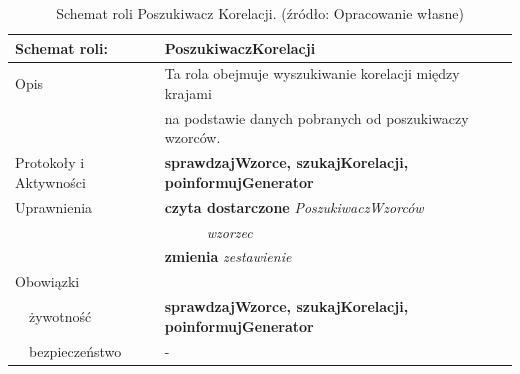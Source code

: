 \documentclass[11pt]{report}
\begin{document}
    \begin{table}[ht!]
        \begin{tabular}{ll}
            Schemat roli:          & PoszukiwaczKorelacji                                           \\ \hline
            Opis                   & Ta rola obejmuje wyszukiwanie korelacji między krajami         \\
            & na podstawie danych pobranych od poszukiwaczy wzorców.         \\
            Protokoły i Aktywności & \textbf{sprawdzajWzorce, szukajKorelacji, poinformujGenerator} \\
            Uprawnienia            & \textbf{czyta dostarczone} \textit{PoszukiwaczWzorców}         \\
            & ~~~~~~\textit{wzorzec}                                         \\
            & \textbf{zmienia} \textit{zestawienie}                          \\
            Obowiązki              &                                                                \\
            ~~żywotność            & \textbf{sprawdzajWzorce, szukajKorelacji, poinformujGenerator} \\
            ~~bezpieczeństwo       & -                                                              \\
        \end{tabular}
        \caption{Schemat roli Poszukiwacz Korelacji. (źródło: Opracowanie własne)}
        \label{tab:schemat roli poszukiwacz korelacji}
    \end{table}
\end{document}
